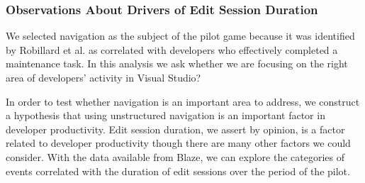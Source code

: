 \documentclass{sig-alternate}
\begin{document}
%
%
%

\subsubsection{Observations About Drivers of Edit Session Duration}

We selected navigation as the subject of the pilot game because it was identified by Robillard et al.\cite{wbsnipes:Robillard2004How} as correlated with developers who effectively completed a maintenance task.    In this analysis we ask whether we are focusing on the right area of developers' activity in Visual Studio?

In order to test whether navigation is an important area to address, we construct a hypothesis that using unstructured navigation is an important factor in developer productivity.  Edit session duration, we assert by opinion, is a factor related to developer productivity though there are many other factors we could consider.  With the data available from Blaze, we can explore the categories of events correlated with the duration of edit sessions over the period of the pilot.  
\end{document}
